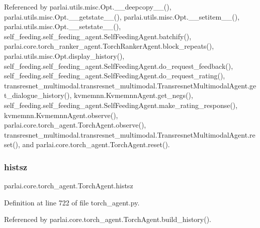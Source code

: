 Referenced by parlai.\+utils.\+misc.\+Opt.\+\_\+\+\_\+deepcopy\+\_\+\+\_\+(), parlai.\+utils.\+misc.\+Opt.\+\_\+\+\_\+getstate\+\_\+\+\_\+(), parlai.\+utils.\+misc.\+Opt.\+\_\+\+\_\+setitem\+\_\+\+\_\+(), parlai.\+utils.\+misc.\+Opt.\+\_\+\+\_\+setstate\+\_\+\+\_\+(), self\+\_\+feeding.\+self\+\_\+feeding\+\_\+agent.\+Self\+Feeding\+Agent.\+batchify(), parlai.\+core.\+torch\+\_\+ranker\+\_\+agent.\+Torch\+Ranker\+Agent.\+block\+\_\+repeats(), parlai.\+utils.\+misc.\+Opt.\+display\+\_\+history(), self\+\_\+feeding.\+self\+\_\+feeding\+\_\+agent.\+Self\+Feeding\+Agent.\+do\+\_\+request\+\_\+feedback(), self\+\_\+feeding.\+self\+\_\+feeding\+\_\+agent.\+Self\+Feeding\+Agent.\+do\+\_\+request\+\_\+rating(), transresnet\+\_\+multimodal.\+transresnet\+\_\+multimodal.\+Transresnet\+Multimodal\+Agent.\+get\+\_\+dialogue\+\_\+history(), kvmemnn.\+Kvmemnn\+Agent.\+get\+\_\+negs(), self\+\_\+feeding.\+self\+\_\+feeding\+\_\+agent.\+Self\+Feeding\+Agent.\+make\+\_\+rating\+\_\+response(), kvmemnn.\+Kvmemnn\+Agent.\+observe(), parlai.\+core.\+torch\+\_\+agent.\+Torch\+Agent.\+observe(), transresnet\+\_\+multimodal.\+transresnet\+\_\+multimodal.\+Transresnet\+Multimodal\+Agent.\+reset(), and parlai.\+core.\+torch\+\_\+agent.\+Torch\+Agent.\+reset().

\mbox{\label{classparlai_1_1core_1_1torch__agent_1_1TorchAgent_a15cbb1f743c1d341d914ade47e49071b}} 
\subsubsection{\texorpdfstring{histsz}{histsz}}
{\footnotesize\ttfamily parlai.\+core.\+torch\+\_\+agent.\+Torch\+Agent.\+histsz}



Definition at line 722 of file torch\+\_\+agent.\+py.



Referenced by parlai.\+core.\+torch\+\_\+agent.\+Torch\+Agent.\+build\+\_\+history().

\mbox{\label{classparlai_1_1core_1_1torch__agent_1_1TorchAgent_a4ac66a09c1c164ea08f4b257c61c38a0}} 
